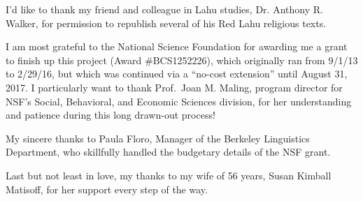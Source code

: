 I'd like to thank my friend and colleague in Lahu studies, Dr. Anthony
R. Walker, for permission to republish several of his Red Lahu religious
texts.

I am most grateful to the National Science Foundation for awarding me
a grant to finish up this project (Award \#BCS1252226), which
originally ran from 9/1/13 to 2/29/16, but which was continued via a
``no-cost extension'' until August 31, 2017. I particularly want to
thank Prof.\ Joan M. Maling, program director for NSF's Social,
Behavioral, and Economic Sciences division, for her understanding and
patience during this long drawn-out process!

My sincere thanks to Paula Floro, Manager of the Berkeley Linguistics
Department, who skillfully handled the budgetary details of the NSF
grant.

Last but not least in love, my thanks to my wife of 56 years, Susan
Kimball Matisoff, for her support every step of the way.
